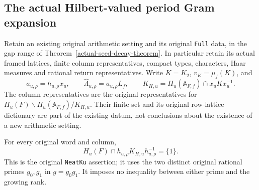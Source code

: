 \subsection{The actual Hilbert-valued period Gram expansion}
\label{global-gram-period-identity}

Retain an existing original arithmetic setting and its original
\texttt{Full} data, in the gap range of
Theorem~\ref{actual-seed-decay-theorem}.  In particular retain its
actual framed lattices, finite column representatives, compact types,
characters, Haar measures and rational return representatives.  Write
$K=K_2$, $v_K=\mu_f(K)$, and
\[
 a_{u,\rho}=h_{u,\rho}x_u,\qquad
 \widehat\Lambda_{u,\rho}=a_{u,\rho}L_f,\qquad
 K_{H,u}=H_u(\mathbb A_{F,f})\cap x_uKx_u^{-1}.
\]
The column representatives are the original representatives for
$H_u(F)\backslash H_u(\mathbb A_{F,f})/K_{H,u}$.
Their finite set and its original row-lattice dictionary are part of
the existing datum, not conclusions about the existence of a new
arithmetic setting.

\begin{proposition}
\label{global-gram-original-column-free}
For every original word and column,
\[
 H_u(F)\cap h_{u,\rho}K_{H,u}h_{u,\rho}^{-1}=\{1\}.
\]
This is the original \texttt{NeatKu} assertion; it uses the two
distinct original rational primes $g_0,g_1$ in $g=g_0g_1$.
It imposes no inequality between either prime and the growing rank.
\end{proposition}

